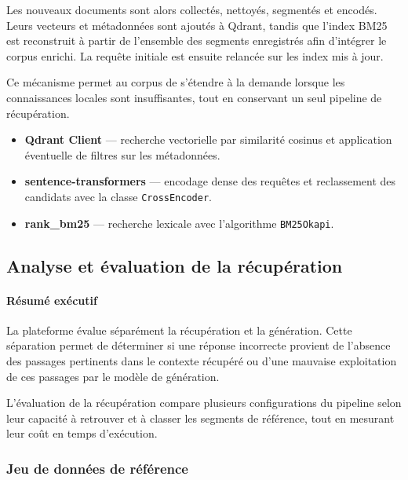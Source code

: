 Les nouveaux documents sont alors collectés, nettoyés, segmentés et encodés. Leurs
vecteurs et métadonnées sont ajoutés à Qdrant, tandis que l'index BM25 est reconstruit
à partir de l'ensemble des segments enregistrés afin d'intégrer le corpus enrichi. La
requête initiale est ensuite relancée sur les index mis à jour.

Ce mécanisme permet au corpus de s'étendre à la demande lorsque les connaissances
locales sont insuffisantes, tout en conservant un seul pipeline de récupération.

\begin{encadre}
\begin{itemize}
  \item \textbf{Qdrant Client} — recherche vectorielle par similarité cosinus et
        application éventuelle de filtres sur les métadonnées.
  \item \textbf{sentence-transformers} — encodage dense des requêtes et reclassement
        des candidats avec la classe \texttt{CrossEncoder}.
  \item \textbf{rank\_bm25} — recherche lexicale avec l'algorithme
        \texttt{BM25Okapi}.
\end{itemize}
\end{encadre}

\subsection{Analyse et évaluation de la récupération}

\paragraph{Résumé exécutif}

La plateforme évalue séparément la récupération et la génération. Cette séparation
permet de déterminer si une réponse incorrecte provient de l'absence des passages
pertinents dans le contexte récupéré ou d'une mauvaise exploitation de ces passages
par le modèle de génération.

L'évaluation de la récupération compare plusieurs configurations du pipeline selon
leur capacité à retrouver et à classer les segments de référence, tout en mesurant
leur coût en temps d'exécution.

\subsubsection{Jeu de données de référence}

